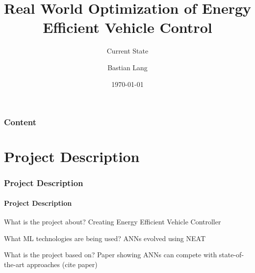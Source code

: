 \documentclass[8pt]{beamer}
\title[Energy Efficient Vehicle Control]{Real World Optimization of Energy Efficient Vehicle Control}
\subtitle[Current State]{Current State}
\author{Bastian Lang} %
\institute[BRSU] %
{
Bonn-Rhein-Sieg University of Applied Science \\ %
}
\date{\today}
\begin{document}
\listoffigures

\begin{frame}
	\titlepage
\end{frame}

\begin{frame}
	\frametitle{Content}
	\tableofcontents[hideallsubsections]
\end{frame}

\section{Project Description}
\begin{frame}
	\frametitle{Project Description}
	\framesubtitle{Project Description}
	\begin{block}{What is the project about?}
		\pause
		Creating Energy Efficient Vehicle Controller  
	\end{block}	
	\pause	
	\begin{block}{What ML technologies are being used?}
		\pause
		ANNs evolved using NEAT
	\end{block}
	\pause
	\begin{block}{What is the project based on?}
		\pause		
		Paper showing ANNs can compete with state-of-the-art approaches (cite paper)
	\end{block}
\end{frame}
\end{document}
